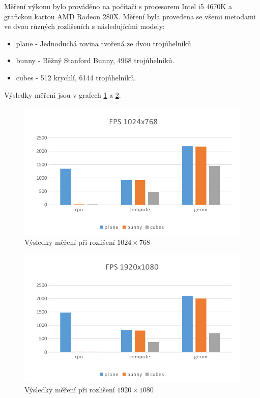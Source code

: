 \documentclass[a4paper, 12pt]{article}
\begin{document}
Měření výkonu bylo prováděno na počítači s procesorem Intel i5 4670K a grafickou kartou AMD Radeon 280X. Měření byla provedena se všemi metodami ve dvou různých rozlišeních s následujícími modely:

\begin{itemize}
	\item plane - Jednoduchá rovina tvořená ze dvou trojúhelníků.
	\item bunny - Běžný Stanford Bunny, 4968 trojúhelníků.
	\item cubes - 512 krychlí, 6144 trojúhelníků.
\end{itemize}

Výsledky měření jsou v grafech \ref{fig:mereni-1024} a \ref{fig:mereni-1920}.

\begin{figure}[H]
	\centering
	\includegraphics[width=12cm,keepaspectratio]{mereni-1024}
	\caption{Výsledky měření při rozlišení $1024\times768$}
	\label{fig:mereni-1024}
\end{figure}

\begin{figure}[H]
	\centering
	\includegraphics[width=12cm,keepaspectratio]{mereni-1920}
	\caption{Výsledky měření při rozlišení $1920\times1080$}
	\label{fig:mereni-1920}
\end{figure}
\end{document}
